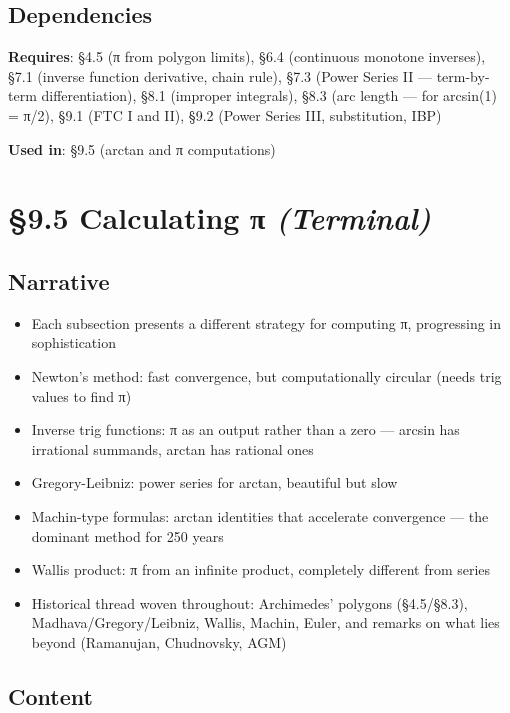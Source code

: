 \documentclass[
  10pt,
  letterpaper,
]{scrbook}
\providecommand{\tightlist}{%
  \setlength{\itemsep}{0pt}\setlength{\parskip}{0pt}}
\begin{document}
\subsection{Dependencies}\label{dependencies-41}

\textbf{Requires}: §4.5 (π from polygon limits), §6.4 (continuous
monotone inverses), §7.1 (inverse function derivative, chain rule), §7.3
(Power Series II --- term-by-term differentiation), §8.1 (improper
integrals), §8.3 (arc length --- for arcsin(1) = π/2), §9.1 (FTC I and
II), §9.2 (Power Series III, substitution, IBP)

\textbf{Used in}: §9.5 (arctan and π computations)

\section{\texorpdfstring{§9.5 Calculating π
\emph{(Terminal)}}{§9.5 Calculating π (Terminal)}}\label{calculating-ux3c0-terminal}

\subsection{Narrative}\label{narrative-42}

\begin{itemize}
\tightlist
\item
  Each subsection presents a different strategy for computing π,
  progressing in sophistication
\item
  Newton's method: fast convergence, but computationally circular (needs
  trig values to find π)
\item
  Inverse trig functions: π as an output rather than a zero --- arcsin
  has irrational summands, arctan has rational ones
\item
  Gregory-Leibniz: power series for arctan, beautiful but slow
\item
  Machin-type formulas: arctan identities that accelerate convergence
  --- the dominant method for 250 years
\item
  Wallis product: π from an infinite product, completely different from
  series
\item
  Historical thread woven throughout: Archimedes' polygons (§4.5/§8.3),
  Madhava/Gregory/Leibniz, Wallis, Machin, Euler, and remarks on what
  lies beyond (Ramanujan, Chudnovsky, AGM)
\end{itemize}

\subsection{Content}\label{content-42}
\end{document}
